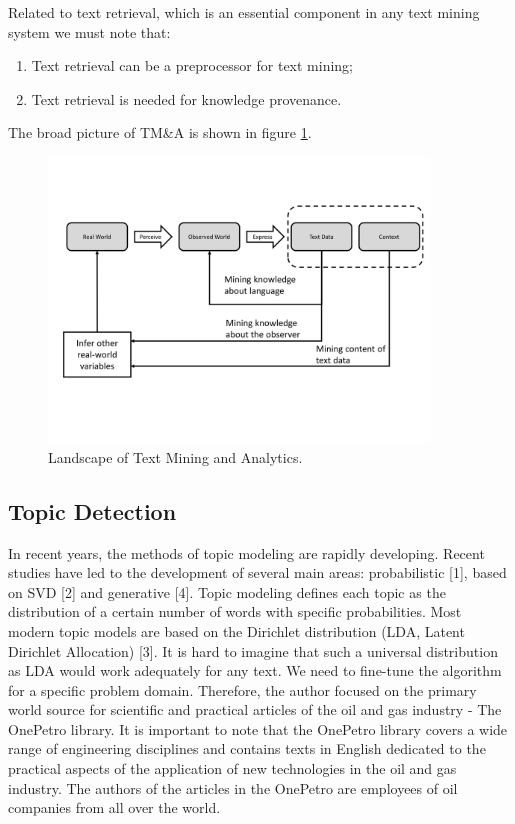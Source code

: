 \documentclass[12pt]{report}
\theoremstyle{definition}
\begin{document}
Related to text retrieval, which is an essential component in any text mining system we must note that:
\begin{enumerate}
	\item Text retrieval can be a preprocessor for text mining;
	\item Text retrieval is needed for knowledge provenance.
\end{enumerate}

The broad picture of TM\&A is shown in figure \ref{fig:tm1}.

\begin{figure}[ht]
	\centering
	\includegraphics[width=0.9\textwidth]{tm1eng}
	\caption{Landscape of Text Mining and Analytics.}
	\label{fig:tm1}
\end{figure}  



\subsection{Topic Detection}\label{sec:topicmodel}

In recent years, the methods of topic modeling are rapidly developing. Recent studies have led to the development of several main areas: probabilistic [1], based on SVD [2] and generative [4].
Topic modeling defines each topic as the distribution of a certain number of words with specific probabilities. 
Most modern topic models are based on the Dirichlet distribution (LDA, Latent Dirichlet Allocation) [3].
It is hard to imagine that such a universal distribution as LDA would work adequately for any text. 
We need to fine-tune the algorithm for a specific problem domain. 
Therefore, the author focused on the primary world source for scientific and practical articles of the oil and gas industry - The OnePetro library. 
It is important to note that the OnePetro library covers a wide range of engineering disciplines and contains texts in English dedicated to the practical aspects of the application of new technologies in the oil and gas industry. 
The authors of the articles in the OnePetro are employees of oil companies from all over the world.
\end{document}
